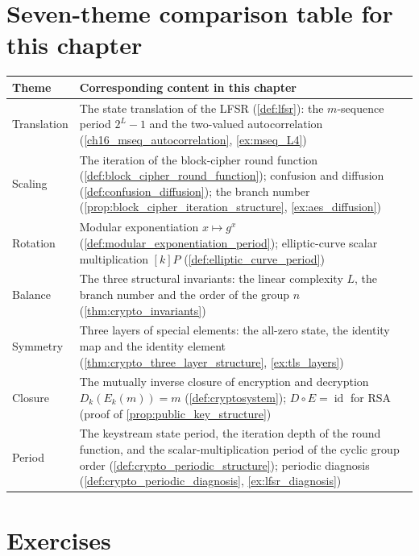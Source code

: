 \section*{Seven-theme comparison table for this chapter}

\begin{center}
\renewcommand{\arraystretch}{1.3}
\begin{tabular}{>{\centering\arraybackslash}p{2.8cm}>{\centering\arraybackslash}p{9.9cm}}
\toprule
Theme & Corresponding content in this chapter \\
\midrule
Translation & The state translation of the LFSR (\cref{def:lfsr}): the \(m\)-sequence period \(2^L-1\) and the two-valued autocorrelation (\cref{ch16_mseq_autocorrelation}, \cref{ex:mseq_L4}) \\
Scaling & The iteration of the block-cipher round function (\cref{def:block_cipher_round_function}); confusion and diffusion (\cref{def:confusion_diffusion}); the branch number (\cref{prop:block_cipher_iteration_structure}, \cref{ex:aes_diffusion}) \\
Rotation & Modular exponentiation \(x\mapsto g^x\) (\cref{def:modular_exponentiation_period}); elliptic-curve scalar multiplication \([k]P\) (\cref{def:elliptic_curve_period}) \\
Balance & The three structural invariants: the linear complexity \(L\), the branch number and the order of the group \(n\) (\cref{thm:crypto_invariants}) \\
Symmetry & Three layers of special elements: the all-zero state, the identity map and the identity element (\cref{thm:crypto_three_layer_structure}, \cref{ex:tls_layers}) \\
Closure & The mutually inverse closure of encryption and decryption \(D_k(E_k(m))=m\) (\cref{def:cryptosystem}); \(D\circ E=\operatorname{id}\) for RSA (proof of \cref{prop:public_key_structure}) \\
Period & The keystream state period, the iteration depth of the round function, and the scalar-multiplication period of the cyclic group order (\cref{def:crypto_periodic_structure}); periodic diagnosis (\cref{def:crypto_periodic_diagnosis}, \cref{ex:lfsr_diagnosis}) \\
\bottomrule
\end{tabular}
\end{center}

\section*{Exercises}

